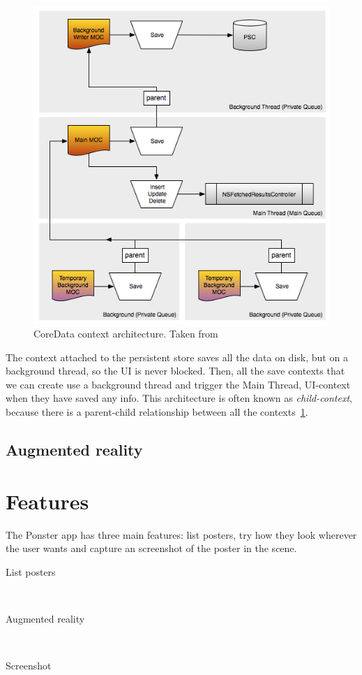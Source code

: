 \begin{figure}
\centering
\includegraphics[scale=0.55]{img/coredataarch.png}
\caption{\label{fig:coredataarch}CoreData context architecture. Taken from~\cite{coredataarch}}
\end{figure} 

The context attached to the persistent store saves all the data on disk, but on a
background thread, so the UI is never blocked. Then, all the save contexts that we
can create use a background thread and trigger the Main Thread, UI-context when they
have saved any info. This architecture is often known as \emph{child-context},
because there is a parent-child relationship between all the
contexts~\ref{fig:coredataarch}. 

\subsection{Augmented reality}

\section{Features}
The Ponster app has three main features: list posters, try how they look wherever
the user wants and capture an screenshot of the poster in the scene.

\begin{description}
\item [List posters] \hfill \\
\item [Augmented reality] \hfill \\
\item [Screenshot] \hfill \\
\end{description}
